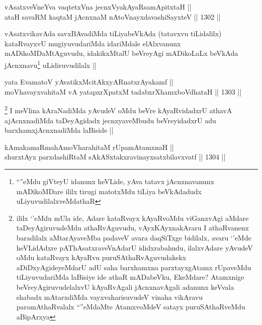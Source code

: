 
\begin{shl}
vAsatxveVneYva vaqtetxVna jecnxVyakAyaRsamApitxtaH || \\
ataH savaRM kaqtaM jAcnxnaM nAtoV\s nayxdavashiSayxteV ||  1302 ||  
\end{shl}

\begin{artha}
vAsatxvikavAda savxBAvadiMda tiLiyabeVkAda (tatavxvu tiLidalilx) kataRvayxvU mugiyuvudariMda idariMdale elAlxvanunx mADikoMDaMtAguvudu, idakikxMtalU beVreyAgi mADikoLaLx beVkAda jAcnxnavu\footnote{``\stext''eMdu giVteyU idanunx heVLide, yAva tatavx jAcnxnavanunx mADikoMDare ililx tirugi matotxMdu tiLiya beVkAdadudx uLiyuvudilalxveMdathaR} uLidiruvudilalx || 
\end{artha}


\begin{shl}
yata EvamatoV yAvatikxMcitAkxyARnatxrAyakamf || \\
moVhavayxvahitaM vA yatapxrXpatxM tadabxrXhamxboVdhataH ||  1303 ||  
\end{shl}

\begin{artha}
\footnote{ililx `\stext'eMdu mUla ide, Adare kataRvayx kAyaRvoMdu viGanxvAgi aMdare taDeyAgiruvudeMdu athaRvAguvudu, vAyxKAyxnakAraru I athaRvanenx baradilalx aMtarAyaveMba padaveV avara daqSiTxge bidilalx, avaru `\stext'eMde heVLidAdxre pAThAsatxraveVnAdarU ididxrabahudu, ilalxvAdare yAvudeV oMdu kataRvayx kAyaRvu puruSAthaRvAguvudakekx aDiDxyAgideyeMdarU adU saha barxhamxna parxtayxgAtamx rUpaveMdu tiLiyuvudariMda laBisiye ide athaR mADabeVku, EkeMdare? Atamxnige beVreyAgiruvudelalxvU kAyaRvAgali jAcnxnavAgali adanunx keVvala shabadx mAtarxdiMda vayxvaharisuvudeV vinaha vikAravu paramAthaRvalalx ``\stext''eMdaMte AtamxvoMdeV satayx puruSAthaRveMdu aBipArxya}
I meVlina kAraNadiMda yAvudeV oMdu beVre kAyaRvidadxrU athavA ajAcnxnadiMda taDeyAgidadx jecnxyaveMbudu beVreyidadxrU adu barxhamxjAcnxnadiMda laBiside ||
\end{artha}


\begin{shl}
kAmakamaRmahAmoVharahitaM rUpamAtamxnaH || \\
shurxtAyx parxdashiRtaM sAkASxtakxravinayxsatxbilavxvatf ||  1304 ||  
\end{shl}

